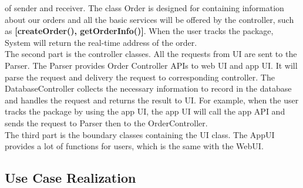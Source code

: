 \documentclass[12pt]{scrreprt}
\begin{document}
of sender and receiver. The class Order is designed for containing information
about our orders and all the basic services will be offered by the controller,
such as \textbf{[createOrder(), getOrderInfo()]}. When the user tracks the
package, System will return the real-time address of the order.\\
The second part is the controller classes. All the requests from UI are sent to
the Parser. The Parser provides Order Controller APIs to web UI and app UI.
It will parse the request and delivery the request to corresponding controller.
The DatabaseController collects the necessary information to record in
the database and handles the request and returns the result to UI. For example,
when the user tracks the package by using the app UI, the app UI will call
the app API and sends the request to Parser then to the OrderController.\\
The third part is the boundary classes containing the UI class. The AppUI
provides a lot of functions for users, which is the same with the WebUI.

\subsection{Use Case Realization}
\end{document}
